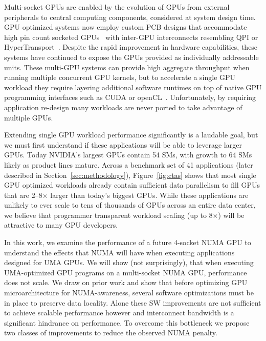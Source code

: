 Multi-socket GPUs are enabled by the evolution of GPUs from external
peripherals to central computing components, considered at system design time.  
GPU optimized systems now employ custom PCB designs that accommodate 
high pin count socketed GPUs~\cite{dgx} with inter-GPU interconnects resembling 
QPI or HyperTransport~\cite{NVLINK,INTELQPI,AMDHT}.  Despite the rapid 
improvement in hardware capabilities, these systems have 
continued to expose the GPUs provided as individually addressable units. These
multi-GPU systems can provide high aggregate throughput when running multiple concurrent
GPU kernels, but to accelerate a single GPU workload they
require layering additional software runtimes on top of native GPU programming 
interfaces such as CUDA or openCL~\cite{CUDA,OPENCL}. Unfortunately, by requiring
application re-design many workloads are never ported to take advantage
of multiple GPUs.

Extending single GPU workload performance significantly is a laudable
goal, but we must first understand if these applications will be able to leverage
larger GPUs.  Today NVIDIA's largest GPUs contain 54 SMs, with growth to 64 SMs
likely as product lines mature. Across a benchmark set of 41 applications
(later described in Section~\ref{sec:methodology}),
Figure~\ref{fig:ctas} shows that most single GPU optimized workloads already
contain sufficient data parallelism to fill GPUs that are 2--8$\times$ larger 
than today's biggest GPUs.  While these applications are unlikely to ever scale to tens
of thousands of GPUs across an entire data center, we believe that programmer
transparent workload scaling (up to 8$\times$) will
be attractive to many GPU developers.

In this work, we examine the performance of a future 4-socket NUMA GPU to 
understand the effects that NUMA will have when executing applications designed 
for UMA GPUs. We will show (not surprisingly), that when executing UMA-optimized 
GPU programs on a multi-socket NUMA GPU, performance does not scale.  We draw on 
prior work and show that before optimizing GPU microarchitecture for 
NUMA-awareness, several software optimizations must be in place to preserve data 
locality.  Alone these SW improvements are not sufficient to achieve scalable 
performance however and interconnect bandwidth is a significant hindrance on 
performance.  To overcome this bottleneck we propose two classes of improvements 
to reduce the observed NUMA penalty.

